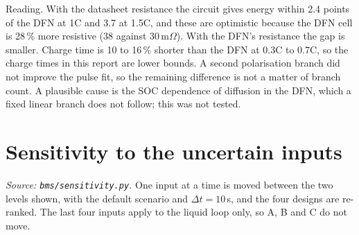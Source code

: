 \documentclass[11pt,a4paper]{article}
\begin{document}
Reading. With the datasheet resistance the circuit gives energy within 2.4 points of the DFN at 1C and 3.7 at 1.5C, and these are optimistic because the DFN cell is 28\,\% more resistive (38 against 30\,m$\Omega$). With the DFN's resistance the gap is smaller. Charge time is 10 to 16\,\% shorter than the DFN at 0.3C to 0.7C, so the charge times in this report are lower bounds. A second polarisation branch did not improve the pulse fit, so the remaining difference is not a matter of branch count. A plausible cause is the SOC dependence of diffusion in the DFN, which a fixed linear branch does not follow; this was not tested.

\section{Sensitivity to the uncertain inputs}\label{sec:sens}
\emph{Source: \texttt{bms/sensitivity.py}.} One input at a time is moved between the two levels shown, with the default scenario and $\Delta t=10$\,s, and the four designs are re-ranked. The last four inputs apply to the liquid loop only, so A, B and C do not move.
\end{document}
